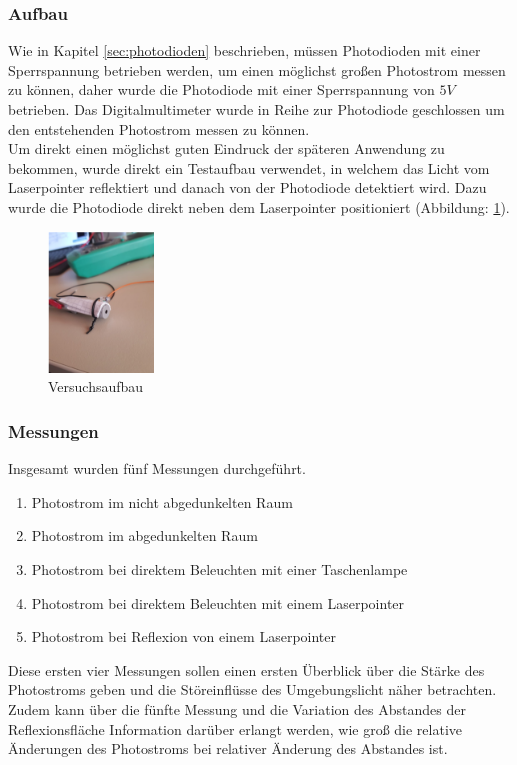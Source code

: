 \subsubsection{Aufbau}
Wie in Kapitel \ref{sec:photodioden} beschrieben, müssen Photodioden mit einer Sperrspannung betrieben werden, um einen möglichst großen Photostrom messen zu können, daher wurde die Photodiode mit einer Sperrspannung von $5V$ betrieben. Das Digitalmultimeter wurde in Reihe zur Photodiode geschlossen um den entstehenden Photostrom messen zu können.\\
Um direkt einen möglichst guten Eindruck der späteren Anwendung zu bekommen, wurde direkt ein Testaufbau verwendet, in welchem das Licht vom Laserpointer reflektiert und danach von der Photodiode detektiert wird. Dazu wurde die Photodiode direkt neben dem Laserpointer positioniert (Abbildung: \ref{versuch1_versuchsaufbau}). 
\begin{figure}[H]
	\centering
	\includegraphics[width=0.25\textwidth]{images/Machbarkeitsstudie/Versuch1_Aufbau}	
	\caption{Versuchsaufbau}
	\label{versuch1_versuchsaufbau}
\end{figure}
\subsubsection{Messungen}
Insgesamt wurden fünf Messungen durchgeführt.
\begin{enumerate}
	\item Photostrom im nicht abgedunkelten Raum
	\item Photostrom im abgedunkelten Raum
	\item Photostrom bei direktem Beleuchten mit einer Taschenlampe
	\item Photostrom bei direktem Beleuchten mit einem Laserpointer
	\item Photostrom bei Reflexion von einem Laserpointer
\end{enumerate}
Diese ersten vier Messungen sollen einen ersten Überblick über die Stärke des Photostroms geben und die Störeinflüsse des Umgebungslicht näher betrachten. Zudem kann über die fünfte Messung und die Variation des Abstandes der Reflexionsfläche Information darüber erlangt werden, wie groß die relative Änderungen des Photostroms bei relativer Änderung des Abstandes ist.

